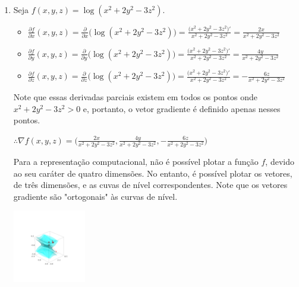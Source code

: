 \documentclass[../main.tex]{subfiles}
\begin{document}
\begin{solucao}
\begin{enumerate}[label=\arabic.]
\begin{enumerate}[label=\alph*)]
						\item Seja $f(x,y,z)=\log(x^2+2y^2-3z^2)$.
						\begin{itemize}
							\item $\frac{\partial f}{\partial x}(x,y,z)=\frac{\partial }{\partial x}\big(\log(x^2+2y^2-3z^2)\big)=\frac{\big( x^2+2y^2-3z^2\big) '}{x^2+2y^2-3z^2}=\frac{2x}{x^2+2y^2-3z^2}$
							\item $\frac{\partial f}{\partial y}(x,y,z)=\frac{\partial }{\partial y}\big(\log(x^2+2y^2-3z^2)\big)=\frac{\big(x^2+2y^2-3z^2\big) '}{x^2+2y^2-3z^2}=\frac{4y}{x^2+2y^2-3z^2}$
							\item $\frac{\partial f}{\partial z}(x,y,z)=\frac{\partial }{\partial z}\big(\log(x^2+2y^2-3z^2)\big)=\frac{\big(x^2+2y^2-3z^2\big) '}{x^2+2y^2-3z^2}=-\frac{6z}{x^2+2y^2-3z^2}$
						\end{itemize}
						Note que essas derivadas parciais existem em todos os pontos onde $x^2+2y^2-3z^2> 0$ e, portanto, o vetor gradiente é definido apenas nesses pontos.
						
						$\therefore \nabla f(x,y,z)=\big(\frac{2x}{x^2+2y^2-3z^2},\frac{4y}{x^2+2y^2-3z^2},-\frac{6z}{x^2+2y^2-3z^2}\big)$
						
						Para a representação computacional, não é possível plotar a função $f$, devido ao seu caráter de quatro dimensões. No entanto, é possível plotar os vetores, de três dimensões, e as cuvas de nível correspondentes. Note que os vetores gradiente são "ortogonais" às curvas de nível.
						
						\begin{center}
							\includegraphics[width=0.25\textwidth]{imagens/lista04/picture_lista04.02_q02_item01.05.png}
						\end{center}
						

\end{enumerate}
\end{enumerate}
\end{solucao}
\end{document}
